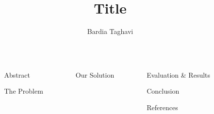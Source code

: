 \documentclass[final]{beamer}
\title{Title}
\author{Bardia Taghavi}
\institute[shortinst]{Florida Atlantic University}
\newlength{\sepwidth}
\newlength{\colwidth}
\newcommand{\separatorcolumn}{\begin{column}{\sepwidth}\end{column}}
\begin{document}
\begin{frame}[t]
\begin{columns}[t]
\separatorcolumn

\begin{column}{\colwidth}
  \begin{block}{Abstract}

  \end{block}

  \begin{block}{The Problem}
    
  \end{block}
\end{column}

\separatorcolumn

\begin{column}{\colwidth}
  \begin{block}{Our Solution}
    
  \end{block}
\end{column}

\separatorcolumn

\begin{column}{\colwidth}
  \begin{block}{Evaluation \& Results}

  \end{block}

  \begin{block}{Conclusion}

  \end{block}

\begin{block}{References}
  \nocite{*}
  \footnotesize{}
\end{block}

\end{column}

\separatorcolumn

\end{columns}
\end{frame}
\end{document}
